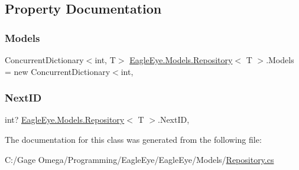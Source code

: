 \subsection{Property Documentation}
\mbox{\label{class_eagle_eye_1_1_models_1_1_repository_a26d864f26d5b20030d5c7c3e9400954a}} 
\subsubsection{\texorpdfstring{Models}{Models}}
{\footnotesize\ttfamily Concurrent\+Dictionary$<$int, T$>$ \mbox{\hyperlink{class_eagle_eye_1_1_models_1_1_repository}{Eagle\+Eye.\+Models.\+Repository}}$<$ T $>$.Models = new Concurrent\+Dictionary$<$int\hspace{0.3cm}{\ttfamily [static]}, {\ttfamily [get]}}

\mbox{\label{class_eagle_eye_1_1_models_1_1_repository_a799dfc419bb17912528a53eff82f50ff}} 
\subsubsection{\texorpdfstring{NextID}{NextID}}
{\footnotesize\ttfamily int? \mbox{\hyperlink{class_eagle_eye_1_1_models_1_1_repository}{Eagle\+Eye.\+Models.\+Repository}}$<$ T $>$.Next\+ID\hspace{0.3cm}{\ttfamily [static]}, {\ttfamily [get]}}







The documentation for this class was generated from the following file\+:\begin{DoxyCompactItemize}
\item 
C\+:/\+Gage Omega/\+Programming/\+Eagle\+Eye/\+Eagle\+Eye/\+Models/\mbox{\hyperlink{_repository_8cs}{Repository.\+cs}}\end{DoxyCompactItemize}
